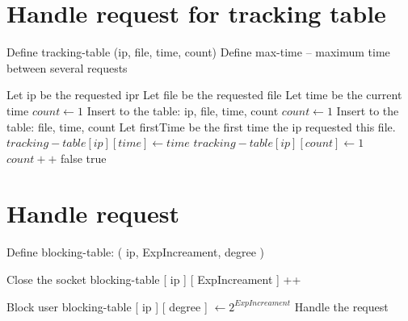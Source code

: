 \documentclass{report}
\begin{document}
\section {Handle request for tracking table}
Define tracking-table (ip, file, time, count)
Define max-time – maximum time between several requests
  \begin{algorithm}
   \caption{}
    \begin{algorithmic}[1]
        	\State Let ip be the requested ipr
	\State Let file be the requested file
	\State Let time be the current time
                 	\State $count \leftarrow 1$
 		\State  Insert to the table: ip, file, time, count	
                     \State $count \leftarrow 1$
 		\State  Insert to the table: file, time, count	    
            \Else
              	\State Let firstTime be the first time the ip requested this file.
                 		\State $tracking-table [ ip ] [ time ]  \leftarrow time$
                 		\State $tracking-table [ ip ] [ count  ]  \leftarrow 1$
            	\Else
                     		\State $count++$
		 	\State \Return false
			\EndIf
		\EndIf
	\EndIf
  	\State \Return true
       \EndFunction
\end{algorithmic}
\end{algorithm}
\newpage
\section {Handle request}
Define blocking-table: ( ip, ExpIncreament, degree )
  \begin{algorithm}
   \caption{}
    \begin{algorithmic}[1]
                 	\State Close the socket
                     \State blocking-table [ ip ] [ ExpIncreament ] ++

                 	\State Block user
	\Else
 		\State  blocking-table [ ip ] [ degree ] $\leftarrow 2^ {ExpIncreament}$
	\EndIf	    
            \Else
              	\State Handle the request
	\EndIf
       \EndFunction
\end{algorithmic}
\end{algorithm}
\end{document}
